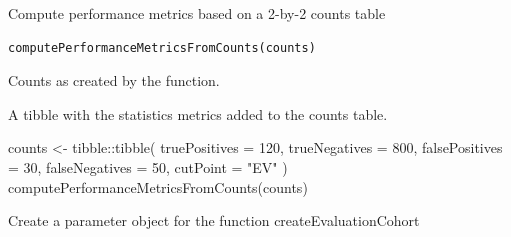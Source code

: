 \documentclass[a4paper]{book}
\begin{document}
%
\begin{Description}
Compute performance metrics based on a 2-by-2 counts table
\end{Description}
%
\begin{Usage}
\begin{verbatim}
computePerformanceMetricsFromCounts(counts)
\end{verbatim}
\end{Usage}
%
\begin{Arguments}
\begin{ldescription}
\item[\code{counts}] Counts as created by the  function.
\end{ldescription}
\end{Arguments}
%
\begin{Value}
A tibble with the statistics metrics added to the counts table.
\end{Value}
%
\begin{Examples}
\begin{ExampleCode}
counts <- tibble::tibble(
  truePositives = 120,
  trueNegatives = 800,
  falsePositives = 30,
  falseNegatives = 50,
  cutPoint = "EV"
)
computePerformanceMetricsFromCounts(counts)

\end{ExampleCode}
\end{Examples}
%
\begin{Description}
Create a parameter object for the function createEvaluationCohort
\end{Description}
%
\end{document}
